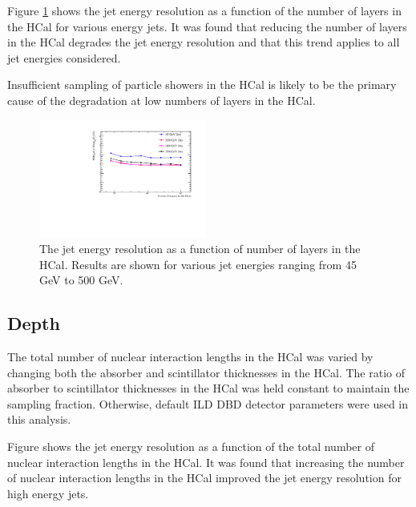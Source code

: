 \documentclass[final,3p,times,twocolumn]{elsarticle}
\begin{document}
Figure \ref{HCalLayers} shows the jet energy resolution as a function of the number of layers in the HCal for various energy jets.  It was found that reducing the number of layers in the HCal degrades the jet energy resolution and that this trend applies to all jet energies considered.  

Insufficient sampling of particle showers in the HCal is likely to be the primary cause of the degradation at low numbers of layers in the HCal.

\begin{figure}[!h]
  \begin{center}
     \includegraphics[width=0.49\textwidth]{6_HCalParamScan/JER_vs_NumberOfLayersInTheHCal.pdf}
     \caption{The jet energy resolution as a function of number of layers in the HCal.  Results are shown for various jet energies ranging from 45 GeV to 500 GeV.\label{HCalLayers}}
  \end{center}
\end{figure}


\subsection{Depth}
The total number of nuclear interaction lengths in the HCal was varied by changing both the absorber and scintillator thicknesses in the HCal.  The ratio of absorber to scintillator thicknesses in the HCal was held constant to maintain the sampling fraction.  Otherwise, default ILD DBD detector parameters were used in this analysis.

Figure \label{HCalDepth} shows the jet energy resolution as a function of the total number of nuclear interaction lengths in the HCal.  It was found that increasing the number of nuclear interaction lengths in the HCal improved the jet energy resolution for high energy jets.  
\end{document}
